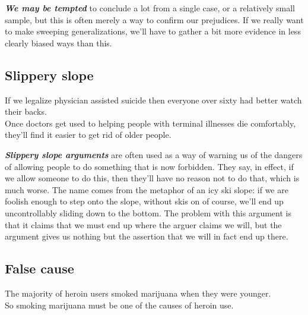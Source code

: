 \documentclass[12pt, openany]{book}
\begin{document}
\textbf{\emph{We may be tempted}} to conclude a lot from a single case, or a relatively small sample, but this is often merely a way to confirm our prejudices. If we really want to make sweeping generalizations, we'll have to gather a bit more evidence in less clearly biased ways than this.

\hypertarget{slippery-slope}{%
\subsection*{Slippery slope}\label{slippery-slope}}


\begin{center}

\begin{argument}

If we legalize physician assisted suicide then everyone over sixty had better watch their backs.\\

Once doctors get used to helping people with terminal illnesses die comfortably, they'll find it easier to get rid of older people.

\end{argument}

\end{center}

\textbf{\emph{Slippery slope arguments}} are often used as a way of warning us of the dangers of allowing people to do something that is now forbidden. They say, in effect, if we allow someone to do this, then they'll have no reason not to do that, which is much worse. The name comes from the metaphor of an icy ski slope: if we are foolish enough to step onto the slope, without skis on of course, we'll end up uncontrollably sliding down to the bottom. The problem with this argument is that it claims that we must end up where the arguer claims we will, but the argument gives us nothing but the assertion that we will in fact end up there.

\hypertarget{false-cause}{%
\subsection*{False cause}\label{false-cause}}


\begin{center}

\begin{argument}

The majority of heroin users smoked marijuana when they were younger.\\
So smoking marijuana must be one of the causes of heroin use.

\end{argument}

\end{center}
\end{document}
